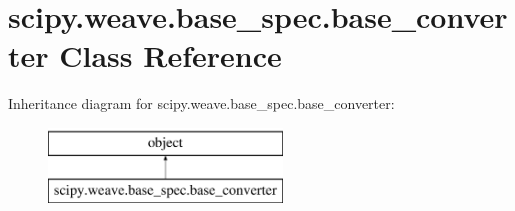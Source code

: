 \hypertarget{classscipy_1_1weave_1_1base__spec_1_1base__converter}{}\section{scipy.\+weave.\+base\+\_\+spec.\+base\+\_\+converter Class Reference}
\label{classscipy_1_1weave_1_1base__spec_1_1base__converter}
Inheritance diagram for scipy.\+weave.\+base\+\_\+spec.\+base\+\_\+converter\+:\begin{figure}[H]
\begin{center}
\leavevmode
\includegraphics[height=2.000000cm]{classscipy_1_1weave_1_1base__spec_1_1base__converter}
\end{center}
\end{figure}
